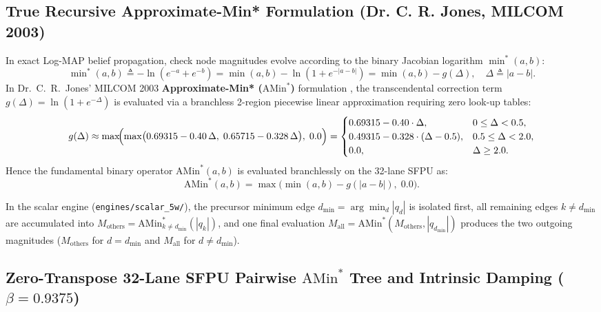 \documentclass[10pt]{article}
\begin{document}
\subsection{True Recursive Approximate-Min* Formulation (Dr. C. R. Jones, MILCOM 2003)}

In exact Log-MAP belief propagation, check node magnitudes evolve according to the binary Jacobian logarithm $\min^*(a, b)$:
\begin{equation}
\min\nolimits^*(a, b) \triangleq -\ln\!\left(e^{-a} + e^{-b}\right) = \min(a, b) - \ln\!\left(1 + e^{-|a - b|}\right) = \min(a, b) - g(\Delta), \quad \Delta \triangleq |a - b|.
\end{equation}
In Dr.~C.~R.~Jones' MILCOM 2003 \textbf{Approximate-Min* ($\mathrm{AMin}^*$)} formulation \cite{jones_approx_min_star}, the transcendental correction term $g(\Delta) = \ln(1 + e^{-\Delta})$ is evaluated via a branchless 2-region piecewise linear approximation requiring zero look-up tables:
\begin{equation}
g(\Delta) \approx \max\!\Bigl(\max\bigl(0.69315 - 0.40\,\Delta,\; 0.65715 - 0.328\,\Delta\bigr),\; 0.0\Bigr) = \begin{cases}
0.69315 - 0.40 \cdot \Delta, & 0 \le \Delta < 0.5, \\
0.49315 - 0.328 \cdot (\Delta - 0.5), & 0.5 \le \Delta < 2.0, \\
0.0, & \Delta \ge 2.0.
\end{cases}
\label{eq:pwl_correction}
\end{equation}
Hence the fundamental binary operator $\mathrm{AMin}^*(a, b)$ is evaluated branchlessly on the 32-lane SFPU as:
\begin{equation}
\mathrm{AMin}^*(a, b) = \max\!\bigl(\min(a, b) - g(|a - b|),\; 0.0\bigr).
\end{equation}

In the scalar engine (\texttt{engines/scalar\_5w/}), the precursor minimum edge $d_{\min} = \arg\min_d |q_d|$ is isolated first, all remaining edges $k \ne d_{\min}$ are accumulated into $M_{\mathrm{others}} = \mathrm{AMin}^*_{k \ne d_{\min}}(|q_k|)$, and one final evaluation $M_{\mathrm{all}} = \mathrm{AMin}^*(M_{\mathrm{others}}, |q_{d_{\min}}|)$ produces the two outgoing magnitudes ($M_{\mathrm{others}}$ for $d = d_{\min}$ and $M_{\mathrm{all}}$ for $d \ne d_{\min}$).

\subsection{Zero-Transpose 32-Lane SFPU Pairwise $\mathrm{AMin}^*$ Tree and Intrinsic Damping ($\beta = 0.9375$)}
\label{sec:zero_transpose_tree}
\end{document}
